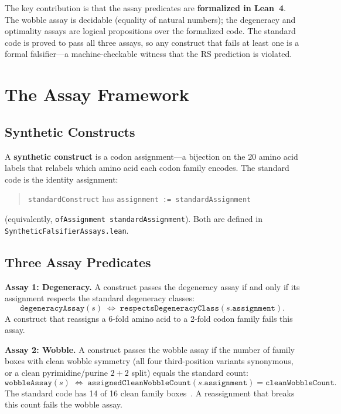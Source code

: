 \documentclass[11pt,twocolumn]{article}
\begin{document}
The key contribution is that the assay predicates are \textbf{formalized
in Lean~4}. The wobble assay is decidable (equality of natural numbers);
the degeneracy and optimality assays are logical propositions over the
formalized code. The standard code is proved to pass all three assays, so
any construct that fails at least one is a formal falsifier---a
machine-checkable witness that the RS prediction is violated.

\section{The Assay Framework}

\subsection{Synthetic Constructs}

A \textbf{synthetic construct} is a codon assignment---a bijection on the
20 amino acid labels that relabels which amino acid each codon family
encodes. The standard code is the identity assignment:

\begin{quote}
\texttt{standardConstruct} has \texttt{assignment := standardAssignment}
\end{quote}

\noindent (equivalently, \texttt{ofAssignment standardAssignment}).
Both are defined in \texttt{SyntheticFalsifierAssays.lean}.

\subsection{Three Assay Predicates}

\textbf{Assay 1: Degeneracy.}
A construct passes the degeneracy assay if and only if its assignment
respects the standard degeneracy classes:
\[
  \texttt{degeneracyAssay}(s) \;\Leftrightarrow\;
  \texttt{respectsDegeneracyClass}(s.\texttt{assignment}).
\]
A construct that reassigns a 6-fold amino acid to a 2-fold codon family
fails this assay.

\textbf{Assay 2: Wobble.}
A construct passes the wobble assay if the number of family boxes with
clean wobble symmetry (all four third-position variants synonymous, or a
clean pyrimidine/purine $2{+}2$ split) equals the standard count:
\[
  \texttt{wobbleAssay}(s) \;\Leftrightarrow\;
  \texttt{assignedCleanWobbleCount}(s.\texttt{assignment}) =
  \texttt{cleanWobbleCount}.
\]
The standard code has 14 of 16 clean family boxes~\cite{Paper3}. A
reassignment that breaks this count fails the wobble assay.
\end{document}
